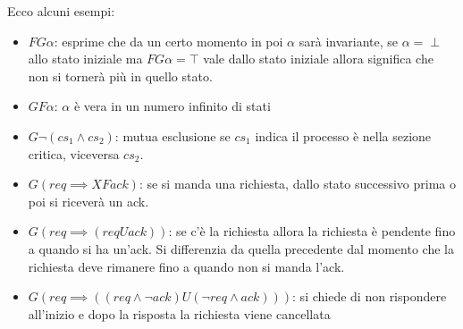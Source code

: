 \begin{esempio}
    Ecco alcuni esempi:
    \begin{itemize}
        \item $FG\alpha$: esprime che da un certo momento in poi $\alpha$ sarà
              invariante, se $\alpha = \perp$ allo stato iniziale ma $FG\alpha = \top$
              vale dallo stato iniziale allora significa che non si tornerà più
              in quello stato.
        \item $GF\alpha$: $\alpha$ è vera in un numero infinito di stati
        \item $G\lnot (cs_1\land cs_2)$: mutua esclusione se $cs_1$ indica il
              processo è nella sezione critica, viceversa $cs_2$.
        \item $G(req \implies XF ack)$: se si manda una richiesta, dallo stato successivo
              prima o poi si riceverà un ack.
        \item $G(req \implies (req U ack))$: se c'è la richiesta allora la richiesta
              è pendente fino a quando si ha un'ack. Si differenzia da quella
              precedente dal momento che la richiesta deve rimanere fino a quando
              non si manda l'ack.
        \item $G(req \implies ((req\land \lnot ack) U (\lnot req \land ack)))$:
              si chiede di non rispondere all'inizio e dopo la risposta la richiesta
              viene cancellata
    \end{itemize}
\end{esempio}
